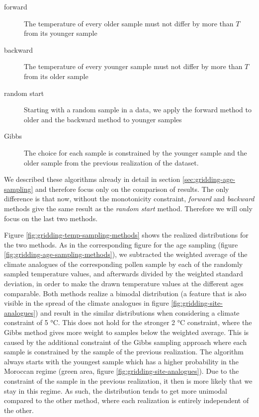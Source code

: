 \begin{refsection}
\begin{description}
	\item[forward] The temperature of every older sample must not differ by more than $T$ from its younger sample
	\item[backward] The temperature of every younger sample must not differ by more than $T$ from its older sample
	\item[random start] Starting with a random sample in a data, we apply the forward method to older and the backward method to younger samples
	\item[Gibbs] The choice for each sample is constrained by the younger sample and the older sample from the previous realization of the dataset.
\end{description}

We described these algorithms already in detail in section \ref{sec:gridding-age-sampling} and therefore focus only on the comparison of results. The only difference is that now, without the monotonicity constraint, \textit{forward} and \textit{backward} methods give the same result as the \textit{random start} method. Therefore we will only focus on the last two methods.

Figure \ref{fig:gridding-temp-sampling-methods} shows the realized distributions for the two methods. As in the corresponding figure for the age sampling (figure \ref{fig:gridding-age-sampling-methods}), we subtracted the weighted average of the climate analogues of the corresponding pollen sample by each of the randomly sampled temperature values, and afterwards divided by the weighted standard deviation, in order to make the drawn temperature values at the different ages comparable. Both methods realize a bimodal distribution (a feature that is also visible in the spread of the climate analogues in figure \ref{fig:gridding-site-analogues}) and result in the similar distributions when considering a climate constraint of 5 °C. This does not hold for the stronger 2 °C constraint, where the Gibbs method gives more weight to samples below the weighted average. This is caused by the additional constraint of the Gibbs sampling approach where each sample is constrained by the sample of the previous realization. The algorithm always starts with the youngest sample which has a higher probability in the Moroccan regime (green area, figure \ref{fig:gridding-site-analogues}). Due to the constraint of the sample in the previous realization, it then is more likely that we stay in this regime. As such, the distribution tends to get more unimodal compared to the other method, where each realization is entirely independent of the other.


\end{refsection}

